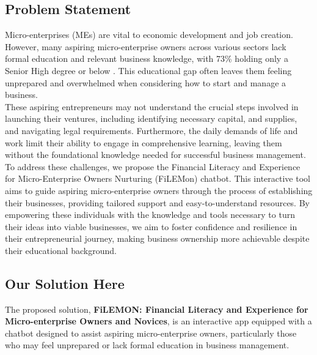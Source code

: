 \documentclass{article}
\begin{document}
\subsection{Problem Statement}

Micro-enterprises (MEs) are vital to economic development and job creation. However, many aspiring micro-enterprise owners across various sectors lack formal education and relevant business knowledge, with 73\% holding only a Senior High degree or below \parencite{rahmawati_analysis_2015}. This educational gap often leaves them feeling unprepared and overwhelmed when considering how to start and manage a business. \\

These aspiring entrepreneurs may not understand the crucial steps involved in launching their ventures, including identifying necessary capital, and supplies, and navigating legal requirements. Furthermore, the daily demands of life and work limit their ability to engage in comprehensive learning, leaving them without the foundational knowledge needed for successful business management. \\

To address these challenges, we propose the Financial Literacy and Experience for Micro-Enterprise Owners Nurturing (FiLEMon) chatbot. This interactive tool aims to guide aspiring micro-enterprise owners through the process of establishing their businesses, providing tailored support and easy-to-understand resources. By empowering these individuals with the knowledge and tools necessary to turn their ideas into viable businesses, we aim to foster confidence and resilience in their entrepreneurial journey, making business ownership more achievable despite their educational background.



\subsection{Our Solution Here}
The proposed solution, \textbf{FiLEMON: Financial Literacy and Experience for Micro-enterprise Owners and Novices}, is an interactive app equipped with a chatbot designed to assist aspiring micro-enterprise owners, particularly those who may feel unprepared or lack formal education in business management. \\
\end{document}
